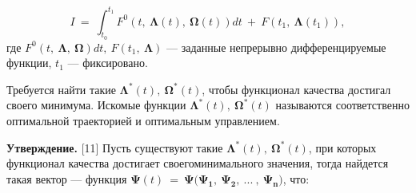 \documentclass[14pt]{extreport}
\begin{document}
\begin{equation}
I\ =\ \int_{t_0}^{t_1}F^0(t,\ \boldsymbol\Lambda(t),\ \boldsymbol\Omega(t))dt\ +\ F(t_1,\ \boldsymbol\Lambda(t_1)),
\end{equation}
где $F^0(t,\ \boldsymbol\Lambda,\ \boldsymbol\Omega)dt,\ F(t_1,\ \boldsymbol\Lambda)$ --- заданные непрерывно дифференцируемые функции, $t_1$ --- фиксировано.

Требуется найти такие $\boldsymbol\Lambda^*(t),\ \boldsymbol\Omega^*(t)$, чтобы функционал качества достигал своего минимума.
Искомые функции $\boldsymbol\Lambda^*(t),\ \boldsymbol\Omega^*(t)$ называются соответственно оптимальной траекторией и оптимальным управлением.

\textbf{Утверждение. }[11] Пусть существуют такие $\boldsymbol\Lambda^*(t),\ \boldsymbol\Omega^*(t)$, при которых функционал качества достигает своегоминимального значения,
тогда найдется такая вектор --- функция $\boldsymbol\Psi(t)\ =\ \boldsymbol\Psi(\boldsymbol{\Psi_1},\ \boldsymbol{\Psi_2},\ ...\ ,\ \boldsymbol{\Psi_n)}$, что:
\end{document}

